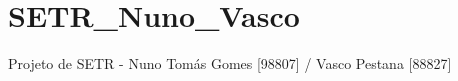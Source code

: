 \chapter{SETR\+\_\+\+Nuno\+\_\+\+Vasco}
\hypertarget{md_README}{}\label{md_README}
\label{md_README_autotoc_md0}%
%
Projeto de SETR -\/ Nuno Tomás Gomes \mbox{[}98807\mbox{]} / Vasco Pestana \mbox{[}88827\mbox{]} 